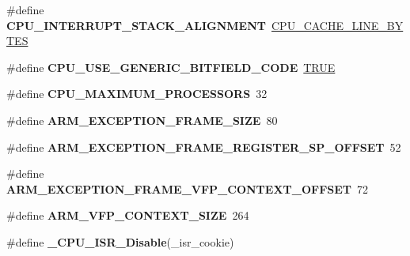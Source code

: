 \begin{DoxyCompactItemize}
\mbox{\label{group__RTEMSScoreCPUARM_ga6a578627686e1020a28f5a295703ca74}} 
\#define {\bfseries C\+P\+U\+\_\+\+I\+N\+T\+E\+R\+R\+U\+P\+T\+\_\+\+S\+T\+A\+C\+K\+\_\+\+A\+L\+I\+G\+N\+M\+E\+NT}~\mbox{\hyperlink{no__cpu_2include_2rtems_2score_2cpu_8h_aafa1399e268a9ae6adf6d6aad4371688}{C\+P\+U\+\_\+\+C\+A\+C\+H\+E\+\_\+\+L\+I\+N\+E\+\_\+\+B\+Y\+T\+ES}}
\item 
\mbox{\label{group__RTEMSScoreCPUARM_gab0aff7a561b9c030a4d88eff201f4688}} 
\#define {\bfseries C\+P\+U\+\_\+\+U\+S\+E\+\_\+\+G\+E\+N\+E\+R\+I\+C\+\_\+\+B\+I\+T\+F\+I\+E\+L\+D\+\_\+\+C\+O\+DE}~\mbox{\hyperlink{group__RTEMSScoreBaseDefs_gaa8cecfc5c5c054d2875c03e77b7be15d}{T\+R\+UE}}
\item 
\mbox{\label{group__RTEMSScoreCPUARM_gadea68a7fa02909edcebee08748f94223}} 
\#define {\bfseries C\+P\+U\+\_\+\+M\+A\+X\+I\+M\+U\+M\+\_\+\+P\+R\+O\+C\+E\+S\+S\+O\+RS}~32
\item 
\mbox{\label{group__RTEMSScoreCPUARM_gad6760d41edb6b7663ecdc758266befa4}} 
\#define {\bfseries A\+R\+M\+\_\+\+E\+X\+C\+E\+P\+T\+I\+O\+N\+\_\+\+F\+R\+A\+M\+E\+\_\+\+S\+I\+ZE}~80
\item 
\mbox{\label{group__RTEMSScoreCPUARM_ga03485191f7b659f18360d8a6fbf644e5}} 
\#define {\bfseries A\+R\+M\+\_\+\+E\+X\+C\+E\+P\+T\+I\+O\+N\+\_\+\+F\+R\+A\+M\+E\+\_\+\+R\+E\+G\+I\+S\+T\+E\+R\+\_\+\+S\+P\+\_\+\+O\+F\+F\+S\+ET}~52
\item 
\mbox{\label{group__RTEMSScoreCPUARM_ga038e6b8ed2601aaf92d0d1a5cc01eb7e}} 
\#define {\bfseries A\+R\+M\+\_\+\+E\+X\+C\+E\+P\+T\+I\+O\+N\+\_\+\+F\+R\+A\+M\+E\+\_\+\+V\+F\+P\+\_\+\+C\+O\+N\+T\+E\+X\+T\+\_\+\+O\+F\+F\+S\+ET}~72
\item 
\mbox{\label{group__RTEMSScoreCPUARM_ga5969f8b55cb512773d186f4214b4d3c6}} 
\#define {\bfseries A\+R\+M\+\_\+\+V\+F\+P\+\_\+\+C\+O\+N\+T\+E\+X\+T\+\_\+\+S\+I\+ZE}~264
\item 
\#define {\bfseries \+\_\+\+C\+P\+U\+\_\+\+I\+S\+R\+\_\+\+Disable}(\+\_\+isr\+\_\+cookie)
\item 
\mbox{\label{group__RTEMSScoreCPUARM_gae3b1e2cd1ea4020d229e759569459664}} 

\end{DoxyCompactItemize}
